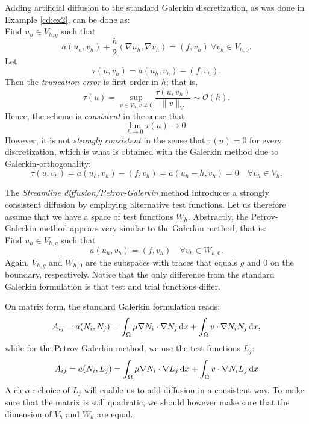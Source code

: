 Adding artificial diffusion 
to the standard Galerkin discretization, 
as was done in Example \ref{cd:ex2}, 
can be done as: \\ 
Find $u_h\in V_{h,g}$ such that 
\[
a(u_h, v_h) + \frac{h}{2}(\nabla u_h, \nabla v_h)  = (f,v_h)\ \forall v_h\in V_{h,0}.
\]
Let
\[
\tau(u, v_h) =  a(u_h, v_h) - (f,v_h). 
\]
Then the \emph{truncation error} is first order in $h$; that is, 
\[
\tau(u) = \sup_{v \in V_h, v \not = 0} \frac{\tau (u, v_h)}{\|v\|_{V}} \sim \mathcal{O}(h). 
\]
Hence, the scheme is \emph{consistent} in the sense that 
\[
\lim_{h\rightarrow 0} \tau (u) \rightarrow 0 .  
\]
However, it is not \emph{strongly consistent} in the sense that $\tau(u) = 0$ for every
discretization, which is what is obtained with the Galerkin method due
to Galerkin-orthogonality:   
\[
\tau(u, v_h) =  a(u_h, v_h) - (f,v_h) = a(u_h - h, v_h) = 0 \quad \forall v_h \in V_h. 
\]


The \textit{Streamline diffusion/Petrov-Galerkin} method introduces a strongly consistent  
diffusion by employing alternative test functions. Let us therefore
assume that we have a space of test functions $W_h$.   
Abstractly, the Petrov-Galerkin method appears very similar to the Galerkin method, that is: \\ 
Find $u_h\in V_{h,g}$ such that 
\[
a(u_h, v_h) = (f,v_h) \quad \forall v_h\in W_{h,0}.
\]
Again, $V_{h,g}$  and $W_{h,0}$ are the subspaces with traces that equals $g$ and $0$ on 
the boundary, respectively.  
Notice that the only difference from the standard Galerkin formulation is that test and trial functions differ. 

On matrix form, the standard Galerkin formulation reads: 
\begin{equation}
A_{ij} = a(N_i, N_j ) = \int_\Omega\mu\nabla N_i \cdot \nabla N_j \, \mathrm{d}x + \int_\Omega v \cdot \nabla N_iN_j \, \mathrm{d}x, 
\label{eq:wGalerkin_A}
\end{equation}
while for the Petrov Galerkin method, we use the test functions $L_j$: 
\[A_{ij} = a(N_i, L_j ) = \int_\Omega\mu\nabla N_i \cdot \nabla L_j \, \mathrm{d}x + \int_\Omega v \cdot \nabla N_iL_j \, \mathrm{d}x\]
A clever choice of $L_j$ will enable us to add diffusion in a consistent way. To make sure
that the matrix is still quadratic, we should however make sure that the dimension of 
$V_h$ and $W_h$ are equal. 

